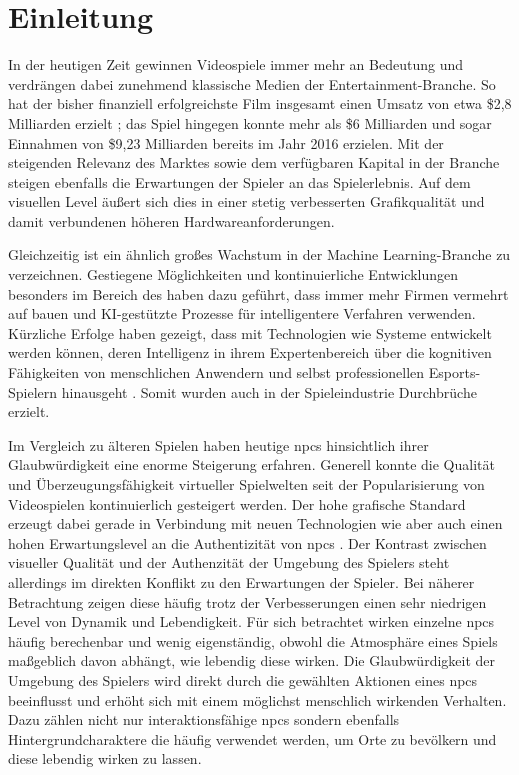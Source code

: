 \chapter{Einleitung}\label{einleitung}
In der heutigen Zeit gewinnen Videospiele immer mehr an Bedeutung und verdrängen dabei zunehmend klassische Medien der Entertainment-Branche. So hat der bisher finanziell erfolgreichste Film  insgesamt einen Umsatz von etwa \$2,8 Milliarden erzielt \cite{endgame}; das Spiel  hingegen konnte mehr als \$6 Milliarden \cite{gta5} und  sogar Einnahmen von \$9,23 Milliarden bereits im Jahr 2016 \cite{wow} erzielen. Mit der steigenden Relevanz des Marktes sowie dem verfügbaren Kapital in der Branche steigen ebenfalls die Erwartungen der Spieler an das Spielerlebnis. Auf dem visuellen Level äußert sich dies in einer stetig verbesserten Grafikqualität und damit verbundenen höheren Hardwareanforderungen.

Gleichzeitig ist ein ähnlich großes Wachstum in der Machine Learning-Branche zu verzeichnen. Gestiegene Möglichkeiten und kontinuierliche Entwicklungen besonders im Bereich des  haben dazu geführt, dass immer mehr Firmen vermehrt auf  bauen und KI-gestützte Prozesse für intelligentere Verfahren verwenden. Kürzliche Erfolge haben gezeigt, dass mit Technologien wie  Systeme entwickelt werden können, deren Intelligenz in ihrem Expertenbereich über die kognitiven Fähigkeiten von menschlichen Anwendern und selbst professionellen Esports-Spielern hinausgeht \cite{openai_five_win}. Somit wurden auch in der Spieleindustrie Durchbrüche erzielt.

Im Vergleich zu älteren Spielen haben heutige \acp{npc} hinsichtlich ihrer Glaubwürdigkeit eine enorme Steigerung erfahren. Generell konnte die Qualität und Überzeugungsfähigkeit virtueller Spielwelten seit der Popularisierung von Videospielen kontinuierlich gesteigert werden. Der hohe grafische Standard erzeugt dabei gerade in Verbindung mit neuen Technologien wie  aber auch einen hohen Erwartungslevel an die Authentizität von \acp{npc} \cite{skyrim_cif-ck_paper}. Der Kontrast zwischen visueller Qualität und der Authenzität der Umgebung des Spielers steht allerdings im direkten Konflikt zu den Erwartungen der Spieler.
Bei näherer Betrachtung zeigen diese häufig trotz der Verbesserungen einen sehr niedrigen Level von Dynamik und Lebendigkeit. Für sich betrachtet wirken einzelne \acp{npc} häufig berechenbar und wenig eigenständig, obwohl die Atmosphäre eines Spiels maßgeblich davon abhängt, wie lebendig diese wirken. Die Glaubwürdigkeit der Umgebung des Spielers wird direkt durch die gewählten Aktionen eines \acp{npc} beeinflusst und erhöht sich mit einem möglichst menschlich wirkenden Verhalten. Dazu zählen nicht nur interaktionsfähige \acp{npc} sondern ebenfalls Hintergrundcharaktere die häufig verwendet werden, um Orte zu bevölkern und diese lebendig wirken zu lassen. 

